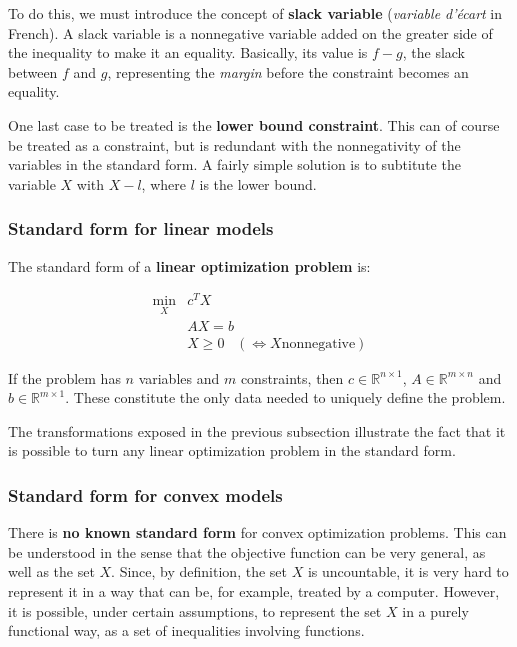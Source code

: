 \documentclass[a4paper]{article}
\begin{document}
To do this, we must introduce the concept of \textbf{slack variable} (\textit{variable d'écart} in French). A slack variable is a nonnegative variable added on the greater side of the inequality to make it an equality. Basically, its value is $f-g$, the slack between $f$ and $g$, representing the \textit{margin} before the constraint becomes an equality. 

One last case to be treated is the \textbf{lower bound constraint}. This can of course be treated as a constraint, but is redundant with the nonnegativity of the variables in the standard form. A fairly simple solution is to subtitute the variable $X$ with $X-l$, where $l$ is the lower bound.

\begin{center}
\end{center}


\subsubsection{Standard form for linear models}
The standard form of a \textbf{linear optimization problem} is:
\begin{framed}
$$\begin{array}{cl}
\min_X & c^T X \\
 & A X = b \\
 & X \geq 0 \;\;\; (\Longleftrightarrow X \text{nonnegative})
\end{array}$$
\end{framed}

If the problem has $n$ variables and $m$ constraints, then $c \in \mathbb{R}^{n\times 1}$, $A \in \mathbb{R}^{m\times n}$ and $b \in \mathbb{R}^{m\times 1}$. These constitute the only data needed to uniquely define the problem. 

The transformations exposed in the previous subsection illustrate the fact that it is possible to turn any linear optimization problem in the standard form.

\subsubsection{Standard form for convex models}
There is \textbf{no known standard form} for convex optimization problems. This can be understood in the sense that the objective function can be very general, as well as the set $X$. Since, by definition, the set $X$ is uncountable, it is very hard to represent it in a way that can be, for example, treated by a computer. However, it is possible, under certain assumptions, to represent the set $X$ in a purely functional way, as a set of inequalities involving functions.
\end{document}
